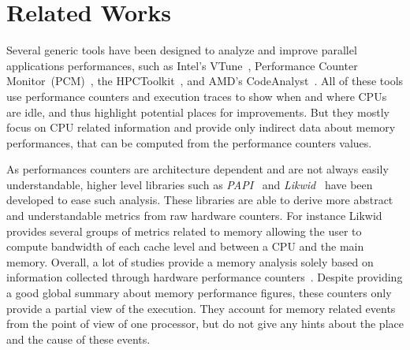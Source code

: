 
\section{Related Works}
\label{sec:related}

Several generic tools have been designed to analyze and improve parallel
applications performances, such as Intel's VTune~\cite{Reinders05VTune},
Performance Counter Monitor~(PCM)~\cite{Intel2012b}, the
HPCToolkit~\cite{Adhianto10HPCTOOLKIT}, and AMD's
CodeAnalyst~\cite{Drongowski2008}. All of these tools use performance
counters and execution traces to show when and where CPUs are idle, and thus
highlight potential places for improvements.
But they mostly focus on CPU related information and provide only
indirect data about memory performances, that can be computed from the performance counters values.

As performances counters are architecture dependent and are not always easily
understandable, higher level libraries such as \emph{PAPI}~\cite{Weaver13PAPI} and
\emph{Likwid}~\cite{Treibig10LIKWID} have been developed to ease such analysis. These
libraries are able to derive more abstract and understandable metrics from raw hardware counters.
For instance Likwid provides several groups of metrics related to memory
allowing the user to compute bandwidth of each cache level and between a CPU
and the main memory.
Overall, a lot of studies provide a memory analysis solely based
on information collected through hardware performance counters~\cite{Majo13(Mis)understanding,
Jiang14Understanding,Bosch00Rivet,Weyers14Visualization,Tao01Visualizing,DeRose01Hardware}.
Despite providing a good global summary about memory performance figures, these counters only provide a partial view of the execution. They
account for memory related events from the point of view of one processor, but do not give any hints about the place and the cause of these events.

